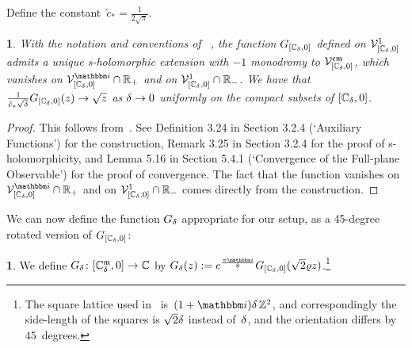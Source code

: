 \documentclass[12pt,oneside,english]{amsart}
\numberwithin{equation}{section}
\numberwithin{figure}{section}
\theoremstyle{plain}
\theoremstyle{plain}
\theoremstyle{plain}
\theoremstyle{plain}
\newtheorem{lem}[thm]{\protect\lemmaname}
\theoremstyle{remark}
\theoremstyle{definition}
\newtheorem{defn}[thm]{\protect\definitionname}
\theoremstyle{plain}
\theoremstyle{plain}
\numberwithin{thm}{section}
\newcommand{\kallemod}[1]{{\color{kallecol} {#1}}}
\providecommand{\definitionname}{Definition}
\providecommand{\lemmaname}{Lemma}
\providecommand{\definitionname}{Definition}
\providecommand{\lemmaname}{Lemma}
\providecommand{\definitionname}{Definition}
\providecommand{\lemmaname}{Lemma}
\providecommand{\definitionname}{Definition}
\providecommand{\lemmaname}{Lemma}
\begin{document}
Define the 
constant~$\tilde{c}_{*}=\frac{1}{2 \sqrt{\pi}}$.
\begin{lem}
\label{lem:extension-spin-spin-sqrt}
With the notation and conventions of~%
\cite{gheissari-hongler-park},
the function $G_{{\left[ {\mathbb{C}_{{\delta}}}, 0 \right]}}$ defined on
$\mathcal{V}_{{\left[ {\mathbb{C}_{{\delta}}}, 0 \right]}}^{1}$ admits a unique
s-holomorphic extension with $-1$ monodromy to 
$\mathcal{V}_{{\left[ {\mathbb{C}_{{\delta}}}, 0 \right]}}^{\mathrm{\mathfrak{c}\mathfrak{m}}}$,
which vanishes on $\mathcal{V}_{\dblcov{\dC, 0}}^{\ii}\cap \R_{+}$
and on $\mathcal{V}_{{\left[ {\mathbb{C}_{{\delta}}}, 0 \right]}}^{1} \cap \mathbb{R}_{-}$.
We have that 
$\frac{1}{\tilde{c}_{*}\sqrt{{\delta}}} G_{{\left[ {\mathbb{C}_{{\delta}}}, 0 \right]}}(z) 
    \to \sqrt{z}$
as ${\delta} \to 0$ uniformly on the compact subsets of ${\left[ {\mathbb{C}_{{\delta}}}, 0 \right]}$.
\end{lem}
\begin{proof}
This follows from~\cite{gheissari-hongler-park}. See Definition 3.24
in Section 3.2.4 (`Auxiliary Functions') for the construction, Remark
3.25 in Section 3.2.4 for the proof of s-holomorphicity, and Lemma
5.16 in Section 5.4.1 (`Convergence of the Full-plane Observable')
for the proof of convergence. The fact that the function vanishes
on $\mathcal{V}_{\dblcov{\dC, 0}}^{\ii} \cap \R_{+}$
and on $\mathcal{V}_{{\left[ {\mathbb{C}_{{\delta}}}, 0 \right]}}^{1} \cap \mathbb{R}_{-}$
comes directly from the construction. 
\end{proof}
We can now define the function $G_{{\delta}}$ appropriate for our setup,
as a 45-degree rotated version of $G_{{\left[ {\mathbb{C}_{{\delta}}}, 0 \right]}}$: 
\begin{defn}
We define $G_{{\delta}}  \colon  {\left[ {\mathbb{C}_{{\delta}}^{\mathfrak{m}}}, 0 \right]} \to \mathbb{C} $
by
$G_{\meshsz}(z) :=
    e^{\frac{\pi \ii}{8}}
    G_{\dblcov{\dC, 0}} (\sqrt{2}\varrho z)$.\footnote{
The square lattice used in~\cite{gheissari-hongler-park}
is~$(1+\ii) \meshsz \, \Z^2$, and correspondingly the side-length of the 
squares is $\sqrt{2}{\delta}$ instead of~${\delta}$, and the orientation differs 
by $45$~degrees.}
\end{defn}
\end{document}
